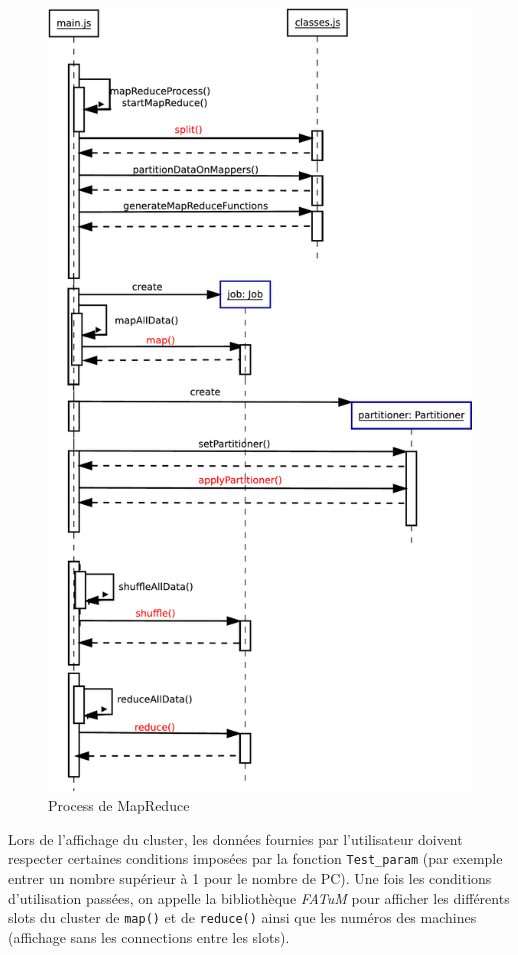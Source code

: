 \begin{figure}[H]
  \centering
    \includegraphics[height=0.95\textheight]{diagram/diag_seq_mapReduce.pdf}
        \caption{Process de MapReduce}
        \label{fig:ProMapRed}
\end{figure}

Lors de l'affichage du cluster, les données fournies par l'utilisateur doivent respecter certaines conditions imposées par la fonction {\tt Test\_param} (par exemple entrer un nombre supérieur à 1 pour le nombre de PC). Une fois les conditions d'utilisation passées, on appelle la bibliothèque {\it FATuM} pour afficher les différents slots du cluster de {\tt map()} et de {\tt reduce()} ainsi que les numéros des machines (affichage sans les connections entre les slots).

